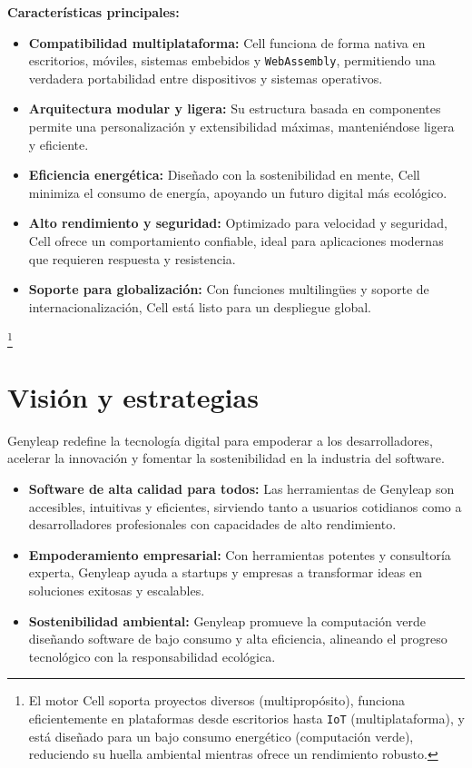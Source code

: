 \documentclass[a4paper,12pt,openany]{book}
\begin{document}
\textbf{Características principales:}
\begin{itemize}
    \item \textbf{Compatibilidad multiplataforma:} Cell funciona de forma nativa en escritorios, móviles, sistemas embebidos y \texttt{WebAssembly}, permitiendo una verdadera portabilidad entre dispositivos y sistemas operativos.
    \item \textbf{Arquitectura modular y ligera:} Su estructura basada en componentes permite una personalización y extensibilidad máximas, manteniéndose ligera y eficiente.
    \item \textbf{Eficiencia energética:} Diseñado con la sostenibilidad en mente, Cell minimiza el consumo de energía, apoyando un futuro digital más ecológico.
    \item \textbf{Alto rendimiento y seguridad:} Optimizado para velocidad y seguridad, Cell ofrece un comportamiento confiable, ideal para aplicaciones modernas que requieren respuesta y resistencia.
    \item \textbf{Soporte para globalización:} Con funciones multilingües y soporte de internacionalización, Cell está listo para un despliegue global.
\end{itemize}

\footnote{El motor Cell soporta proyectos diversos (multipropósito), funciona eficientemente en plataformas desde escritorios hasta \texttt{IoT} (multiplataforma), y está diseñado para un bajo consumo energético (computación verde), reduciendo su huella ambiental mientras ofrece un rendimiento robusto.}

\chapter{Visión y estrategias}

Genyleap redefine la tecnología digital para empoderar a los desarrolladores, acelerar la innovación y fomentar la sostenibilidad en la industria del software.

\begin{itemize}
    \item \textbf{Software de alta calidad para todos:} Las herramientas de Genyleap son accesibles, intuitivas y eficientes, sirviendo tanto a usuarios cotidianos como a desarrolladores profesionales con capacidades de alto rendimiento.
    \item \textbf{Empoderamiento empresarial:} Con herramientas potentes y consultoría experta, Genyleap ayuda a startups y empresas a transformar ideas en soluciones exitosas y escalables.
    \item \textbf{Sostenibilidad ambiental:} Genyleap promueve la computación verde diseñando software de bajo consumo y alta eficiencia, alineando el progreso tecnológico con la responsabilidad ecológica.
\end{itemize}
\end{document}
